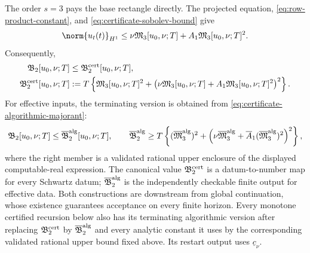 The order \(s=3\) pays the base rectangle directly.  The projected equation,
\eqref{eq:row-product-constant}, and
\eqref{eq:certificate-sobolev-bound} give
\[
 \norm{u_t(t)}_{H^1}
 \le
 \nu\mathfrak M_3[u_0,\nu;T]
 +A_1\mathfrak M_3[u_0,\nu;T]^2.
\]
Consequently,
\begin{equation}
 \begin{aligned}
 \mathfrak B_2[u_0,\nu;T]
 &\le\mathfrak B_2^{\rm cert}[u_0,\nu;T],\\
 \mathfrak B_2^{\rm cert}[u_0,\nu;T]
 &:=
 T\left\{
 \mathfrak M_3[u_0,\nu;T]^2
 +\left(
 \nu\mathfrak M_3[u_0,\nu;T]
 +A_1\mathfrak M_3[u_0,\nu;T]^2
 \right)^2
 \right\}.
 \end{aligned}
 \label{eq:certified-base-rectangle}
\end{equation}
For effective inputs, the terminating version is obtained from
\eqref{eq:certificate-algorithmic-majorant}:
\begin{equation}
 \mathfrak B_2[u_0,\nu;T]
 \le \overline{\mathfrak B}_2^{\rm alg}[u_0,\nu;T],
 \qquad
 \overline{\mathfrak B}_2^{\rm alg}
 \ge
 T\left\{
  (\overline{\mathfrak M}_3^{\rm alg})^2
  +\left(
   \nu\overline{\mathfrak M}_3^{\rm alg}
   +\overline A_1(\overline{\mathfrak M}_3^{\rm alg})^2
  \right)^2
 \right\},
 \label{eq:algorithmic-base-rectangle}
\end{equation}
where the right member is a validated rational upper enclosure of the
displayed computable-real expression.  The canonical value
\(\mathfrak B_2^{\rm cert}\) is a datum-to-number map for every Schwartz
datum; \(\overline{\mathfrak B}_2^{\rm alg}\) is the independently checkable
finite output for effective data.  Both constructions are downstream from
global continuation, whose existence guarantees acceptance on every finite
 horizon.  Every monotone certified recursion below also has its terminating
 algorithmic version after replacing \(\mathfrak B_2^{\rm cert}\) by
 \(\overline{\mathfrak B}_2^{\rm alg}\) and every analytic constant it uses
 by the corresponding validated rational upper bound fixed above.  Its restart
 output uses \(\underline c_\nu\).

